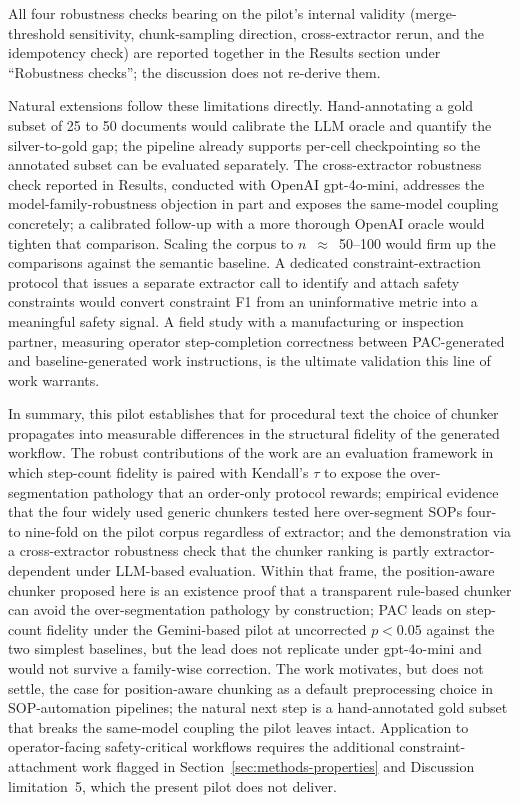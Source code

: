 \documentclass[make,article,submit,oneauthor,pdftex]{Definitions/mdpi}
\begin{document}
All four robustness checks bearing on the pilot's internal validity
(merge-threshold sensitivity, chunk-sampling direction, cross-extractor
rerun, and the idempotency check) are reported together in the
Results section under ``Robustness checks''; the discussion does not
re-derive them.

Natural extensions follow these limitations directly. Hand-annotating
a gold subset of 25 to 50 documents would calibrate the LLM oracle and
quantify the silver-to-gold gap; the pipeline already supports per-cell
checkpointing so the annotated subset can be evaluated separately. The
cross-extractor robustness check reported in Results, conducted with
OpenAI gpt-4o-mini, addresses the model-family-robustness objection in
part and exposes the same-model coupling concretely; a calibrated
follow-up with a more thorough OpenAI oracle would tighten that
comparison. Scaling the corpus to $n$~$\approx$~50--100 would firm up
the comparisons against the semantic baseline. A dedicated
constraint-extraction protocol that issues a separate extractor call
to identify and attach safety constraints would convert constraint F1
from an uninformative metric into a meaningful safety signal. A field
study with a manufacturing or inspection partner, measuring operator
step-completion correctness between PAC-generated and baseline-generated
work instructions, is the ultimate validation this line of work
warrants.

In summary, this pilot establishes that for procedural text the choice
of chunker propagates into measurable differences in the structural
fidelity of the generated workflow. The robust contributions of the
work are an evaluation framework in which step-count fidelity is
paired with Kendall's $\tau$ to expose the over-segmentation pathology
that an order-only protocol rewards; empirical evidence that the four
widely used generic chunkers tested here over-segment SOPs four- to
nine-fold on the pilot corpus regardless of extractor; and the
demonstration via a cross-extractor robustness check that the
chunker ranking is partly extractor-dependent under LLM-based
evaluation. Within that frame, the position-aware chunker proposed
here is an existence proof that a transparent rule-based chunker can
avoid the over-segmentation pathology by construction; PAC leads on
step-count fidelity under the Gemini-based pilot at uncorrected
$p<0.05$ against the two simplest baselines, but the lead does not
replicate under gpt-4o-mini and would not survive a family-wise
correction. The work motivates, but does not settle, the case for
position-aware chunking as a default preprocessing choice in
SOP-automation pipelines; the natural next step is a hand-annotated
gold subset that breaks the same-model coupling the pilot leaves
intact. Application to operator-facing safety-critical workflows
requires the additional constraint-attachment work flagged in
Section~\ref{sec:methods-properties} and Discussion limitation~5,
which the present pilot does not deliver.
\end{document}
